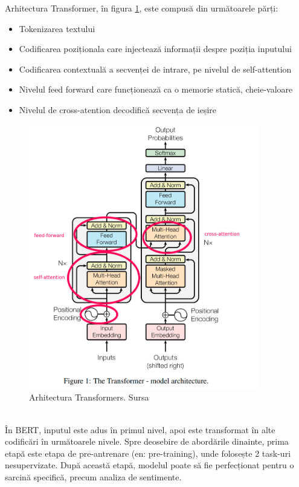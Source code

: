 \noindent Arhitectura Transformer, în figura \ref{fig:transformersArch}, este compusă din următoarele părți: 
\begin{itemize}
    \setlength\itemsep{0.5em}
    \item Tokenizarea textului
    \item Codificarea poziționala care injectează informații despre poziția inputului
    \item Codificarea contextuală a secvenței de intrare, pe nivelul de self-attention
    \item Nivelul feed forward care funcționează ca o memorie statică, cheie-valoare
    \item Nivelul de cross-atention decodifică secvența de ieșire
\end{itemize}
\begin{figure}[ht]
	\centering
	\includegraphics[width=100mm, scale=0.5]{figs/transformersArch.png}
    \caption{Arhitectura Transformers. Sursa~\cite{Transformers}}
	\label{fig:transformersArch}
\end{figure}
\ \\
În BERT, inputul este adus în primul nivel, apoi este transformat în alte codificări în următoarele nivele. 
Spre deosebire de abordările dinainte, prima etapă este etapa de pre-antrenare (en: pre-training), unde folosește 2 task-uri nesupervizate.
După această etapă, modelul poate să fie perfecționat pentru o sarcină specifică, precum analiza de sentimente. \\

